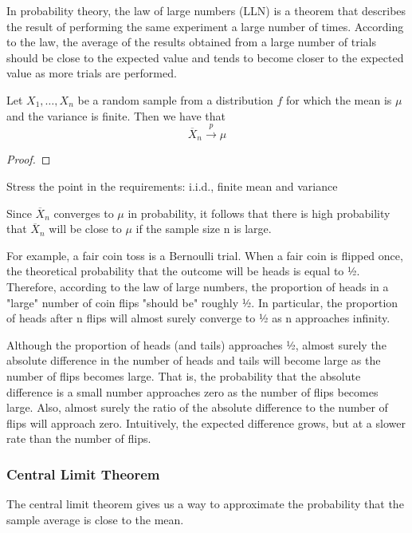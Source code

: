 {\color{red} In probability theory, the law of large numbers (LLN) is a theorem that describes the result of performing the same experiment a large number of times. According to the law, the average of the results obtained from a large number of trials should be close to the expected value and tends to become closer to the expected value as more trials are performed.}

\begin{theorem}
Let $X_1, \ldots, X_n$ be a random sample from a distribution $f$ for which the mean is $\mu$ and the variance is finite. Then we have that
\[
\overline{X}_n \overset{p}{\rightarrow} \mu
\]
\end{theorem}
\begin{proof}
\end{proof}

{\color{red} Stress the point in the requirements: i.i.d., finite mean and variance}

{\color{red} Since $\overline{X}_{n}$ converges to $\mu$ in probability, it follows that there is high probability that $\overline{X}_{n}$ will be close to $\mu$ if the sample size n is large.}

\begin{example}

{\color{red} For example, a fair coin toss is a Bernoulli trial. When a fair coin is flipped once, the theoretical probability that the outcome will be heads is equal to 1⁄2. Therefore, according to the law of large numbers, the proportion of heads in a "large" number of coin flips "should be" roughly 1⁄2. In particular, the proportion of heads after n flips will almost surely converge to 1⁄2 as n approaches infinity.}

{\color{red} Although the proportion of heads (and tails) approaches 1⁄2, almost surely the absolute difference in the number of heads and tails will become large as the number of flips becomes large. That is, the probability that the absolute difference is a small number approaches zero as the number of flips becomes large. Also, almost surely the ratio of the absolute difference to the number of flips will approach zero. Intuitively, the expected difference grows, but at a slower rate than the number of flips.}

\end{example}


\subsubsection{Central Limit Theorem}

{\color{red} The central limit theorem gives us a way to approximate the probability that the sample average is close to the mean.}
